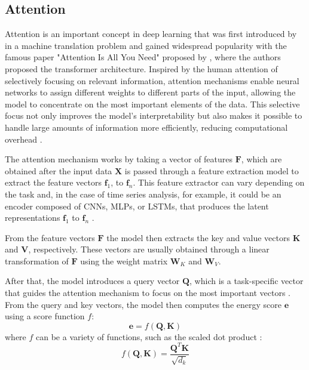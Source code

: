 \subsection{Attention} \label{sec-attention}

Attention is an important concept in deep learning that was first introduced by \cite{bahdanau2016neuralmachinetranslationjointly} in a machine translation problem and gained widespread popularity with the famous paper "Attention Is All You Need" proposed by \cite{vaswani2023attentionneed}, where the authors proposed the transformer architecture. Inspired by the human attention of selectively focusing on relevant information, attention mechanisms enable neural networks to assign different weights to different parts of the input, allowing the model to concentrate on the most important elements of the data. This selective focus not only improves the model's interpretability but also makes it possible to handle large amounts of information more efficiently, reducing computational overhead \cite{NIU202148}.

The attention mechanism works by taking a vector of features $\boldsymbol{F}$, which are obtained after the input data $\boldsymbol{X}$ is passed through a feature extraction model to extract the feature vectors $\boldsymbol{f}_1$, to $\boldsymbol{f}_n$. This feature extractor can vary depending on the task and, in the case of time series analysis, for example, it could be an encoder composed of CNNs, MLPs, or LSTMs, that produces the latent representations $\boldsymbol{f}_1$ to $\boldsymbol{f}_n$ \cite{Brauwers_2023}.

From the feature vectors $\boldsymbol{F}$ the model then extracts the key and value vectors $\boldsymbol{K}$ and $\boldsymbol{V}$, respectively. These vectors are usually obtained through a linear transformation of $\boldsymbol{F}$ using the weight matrix $\boldsymbol{W}_K$ and $\boldsymbol{W}_V$.

After that, the model introduces a query vector $\boldsymbol{Q}$, which is a task-specific vector that guides the attention mechanism to focus on the most important vectors \cite{Brauwers_2023,NIU202148}. From the query and key vectors, the model then computes the energy score $\boldsymbol{e}$ using a score function $f$:
\begin{equation}
    \boldsymbol{e} = f\left(\boldsymbol{Q},\boldsymbol{K}\right)
\end{equation}
where $f$ can be a variety of functions, such as the scaled dot product \cite{vaswani2023attentionneed}:
\begin{equation}
    f\left(\boldsymbol{Q},\boldsymbol{K}\right) = \frac{\boldsymbol{Q}^T \boldsymbol{K}}{\sqrt{d_k}}
\end{equation}

